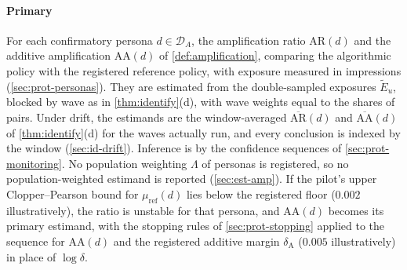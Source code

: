 \paragraph{Primary}
For each confirmatory persona $d\in\mathcal D_A$, the amplification ratio $\mathrm{AR}(d)$ and the additive amplification $\mathrm{AA}(d)$ of \cref{def:amplification}, comparing the algorithmic policy with the registered reference policy, with exposure measured in impressions (\cref{sec:prot-personas}). They are estimated from the double-sampled exposures $\widetilde E_u$, blocked by wave as in \cref{thm:identify}(d), with wave weights equal to the shares of pairs. Under drift, the estimands are the window-averaged $\overline{\mathrm{AR}}(d)$ and $\overline{\mathrm{AA}}(d)$ of \cref{thm:identify}(d) for the waves actually run, and every conclusion is indexed by the window (\cref{sec:id-drift}). Inference is by the confidence sequences of \cref{sec:prot-monitoring}. No population weighting $\Lambda$ of personas is registered, so no population-weighted estimand is reported (\cref{sec:est-amp}). If the pilot's upper Clopper--Pearson bound for $\mu_{\mathrm{ref}}(d)$ lies below the registered floor ($0.002$ illustratively), the ratio is unstable for that persona, and $\mathrm{AA}(d)$ becomes its primary estimand, with the stopping rules of \cref{sec:prot-stopping} applied to the sequence for $\mathrm{AA}(d)$ and the registered additive margin $\delta_{\mathrm A}$ ($0.005$ illustratively) in place of $\log\delta$.

